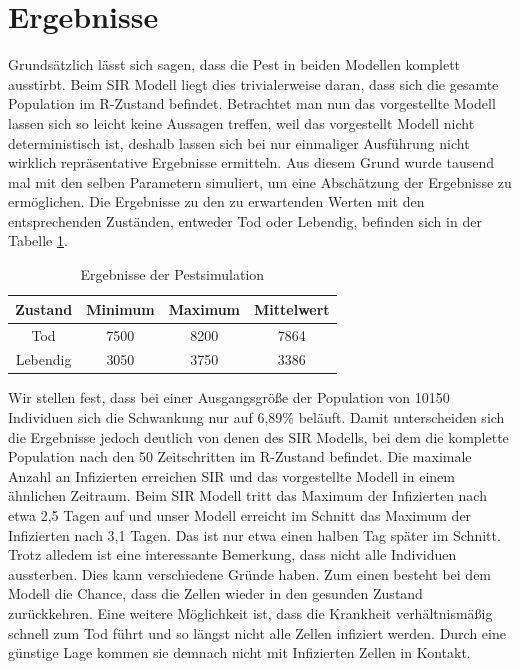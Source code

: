 \documentclass[10pt,twocolumn]{scrartcl}
\begin{document}
\section*{Ergebnisse}
Grundsätzlich lässt sich sagen, dass die Pest in beiden Modellen komplett ausstirbt. Beim SIR Modell liegt dies trivialerweise daran, dass sich die gesamte Population im R-Zustand befindet. Betrachtet man nun das vorgestellte Modell lassen sich so leicht keine Aussagen treffen, weil das vorgestellt Modell nicht deterministisch ist, deshalb lassen sich bei nur einmaliger Ausführung nicht wirklich repräsentative Ergebnisse ermitteln. Aus diesem Grund wurde tausend mal mit den selben Parametern simuliert, um eine Abschätzung der Ergebnisse zu ermöglichen. Die Ergebnisse zu den zu erwartenden Werten mit den entsprechenden Zuständen, entweder Tod oder Lebendig, befinden sich in der Tabelle \ref{tab:ergebnisse}.
\begin{table}[H]
	\caption{Ergebnisse der Pestsimulation}
	\label{tab:ergebnisse}
	\centering
	\begin{tabular}{|c|ccc|}
		\rowcolor{dunkelgrau}
		\hline
		Zustand &	Minimum & Maximum & Mittelwert \\ \hline
		Tod & 7500 & 8200 & 7864 \\ 
	\rowcolor{grau}		Lebendig & 3050 & 3750 & 3386\\
	\hline
	\end{tabular}
\end{table}
Wir stellen fest, dass bei einer Ausgangsgröße der Population von 10150 Individuen sich die Schwankung nur auf 6,89\% beläuft. Damit unterscheiden sich die Ergebnisse jedoch deutlich von denen des SIR Modells, bei dem die komplette Population nach den 50 Zeitschritten im R-Zustand befindet. Die maximale Anzahl an Infizierten erreichen SIR und das vorgestellte Modell in einem ähnlichen Zeitraum. Beim SIR Modell tritt das Maximum der Infizierten nach etwa 2,5 Tagen auf und unser Modell erreicht im Schnitt das Maximum der Infizierten nach 3,1 Tagen. Das ist nur etwa einen halben Tag später im Schnitt.
Trotz alledem ist eine interessante Bemerkung, dass nicht alle Individuen aussterben. Dies kann verschiedene Gründe haben. Zum einen besteht bei dem Modell die Chance, dass die Zellen wieder in den gesunden Zustand zurückkehren. Eine weitere Möglichkeit ist, dass die Krankheit verhältnismäßig schnell zum Tod führt und so längst nicht alle Zellen infiziert werden. Durch eine günstige Lage kommen sie demnach nicht mit Infizierten Zellen in Kontakt.   
\end{document}
